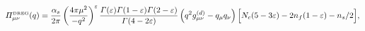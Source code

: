 \begin{equation}
\label{PolarizationDREG}
{\mit\Pi}^{\mbox{\tiny DREG}}_{\mu\nu} (q) =
\frac{\alpha_s}{2 \pi}
\left( \frac{4 \pi \mu^2}{- q^2} \right)^\varepsilon
\frac{
{\mit\Gamma} (\varepsilon) {\mit\Gamma} (1 - \varepsilon) {\mit\Gamma} (2 -
\varepsilon) }{ {\mit\Gamma} (4 - 2 \varepsilon) }
\left( q^2 g^{(d)}_{\mu\nu} - q_\mu q_\nu \right)
\Big[
N_c (5 - 3 \varepsilon) - 2 n_f (1 - \varepsilon) - n_s/2
\Big]
,
\end{equation}

